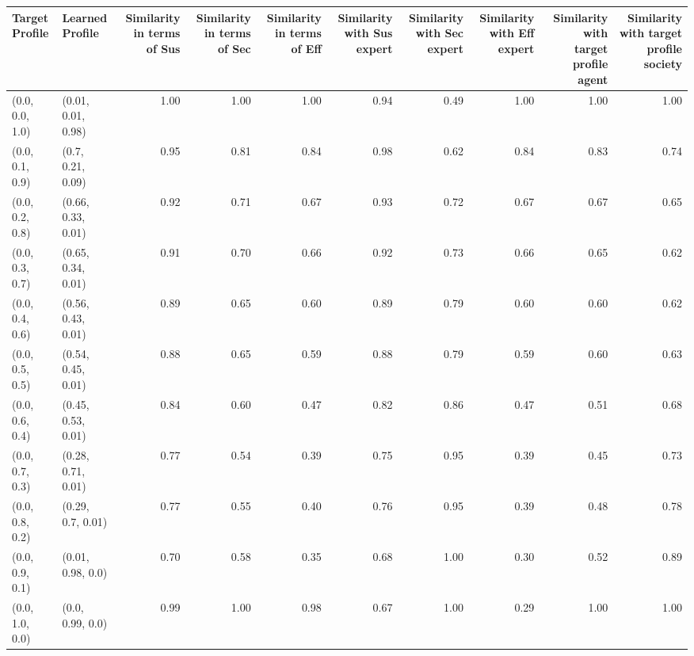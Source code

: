 \begin{tabular}{llrrrrrrrr}
\toprule
Target Profile & Learned Profile & Similarity in terms of Sus & Similarity in terms of Sec & Similarity in terms of Eff & Similarity with Sus expert & Similarity with Sec expert & Similarity with Eff expert & Similarity with target profile agent & Similarity with target profile society \\
\midrule
(0.0, 0.0, 1.0) & (0.01, 0.01, 0.98) & 1.00 & 1.00 & 1.00 & 0.94 & 0.49 & 1.00 & 1.00 & 1.00 \\
(0.0, 0.1, 0.9) & (0.7, 0.21, 0.09) & 0.95 & 0.81 & 0.84 & 0.98 & 0.62 & 0.84 & 0.83 & 0.74 \\
(0.0, 0.2, 0.8) & (0.66, 0.33, 0.01) & 0.92 & 0.71 & 0.67 & 0.93 & 0.72 & 0.67 & 0.67 & 0.65 \\
(0.0, 0.3, 0.7) & (0.65, 0.34, 0.01) & 0.91 & 0.70 & 0.66 & 0.92 & 0.73 & 0.66 & 0.65 & 0.62 \\
(0.0, 0.4, 0.6) & (0.56, 0.43, 0.01) & 0.89 & 0.65 & 0.60 & 0.89 & 0.79 & 0.60 & 0.60 & 0.62 \\
(0.0, 0.5, 0.5) & (0.54, 0.45, 0.01) & 0.88 & 0.65 & 0.59 & 0.88 & 0.79 & 0.59 & 0.60 & 0.63 \\
(0.0, 0.6, 0.4) & (0.45, 0.53, 0.01) & 0.84 & 0.60 & 0.47 & 0.82 & 0.86 & 0.47 & 0.51 & 0.68 \\
(0.0, 0.7, 0.3) & (0.28, 0.71, 0.01) & 0.77 & 0.54 & 0.39 & 0.75 & 0.95 & 0.39 & 0.45 & 0.73 \\
(0.0, 0.8, 0.2) & (0.29, 0.7, 0.01) & 0.77 & 0.55 & 0.40 & 0.76 & 0.95 & 0.39 & 0.48 & 0.78 \\
(0.0, 0.9, 0.1) & (0.01, 0.98, 0.0) & 0.70 & 0.58 & 0.35 & 0.68 & 1.00 & 0.30 & 0.52 & 0.89 \\
(0.0, 1.0, 0.0) & (0.0, 0.99, 0.0) & 0.99 & 1.00 & 0.98 & 0.67 & 1.00 & 0.29 & 1.00 & 1.00 \\
\bottomrule
\end{tabular}

